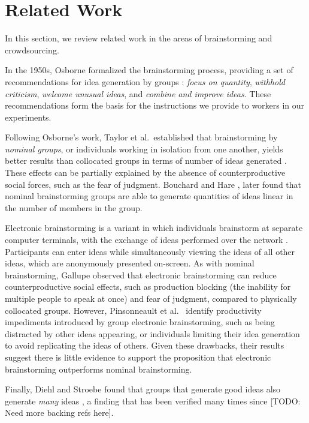 \section{Related Work}
In this section, we review related work in the areas of brainstorming and crowdsourcing.

In the 1950s, Osborne formalized the brainstorming process, providing a set of recommendations for idea generation by groups \cite{osborn_applied_1957}: \emph{focus on quantity}, \emph{withhold criticism}, \emph{welcome unusual ideas}, and \emph{combine and improve ideas}. These recommendations form the basis for the instructions we provide to workers in our experiments.

Following Osborne's work, Taylor et al.\ established that brainstorming by \emph{nominal groups}, or individuals working in isolation from one another, yields better results than collocated groups in terms of number of ideas generated \cite{taylor_does_1958}. These effects can be partially explained by the absence of counterproductive social forces, such as the fear of judgment. Bouchard and Hare \cite{bouchard_jr_size_1970}, later found that nominal brainstorming groups are able to generate quantities of ideas linear in the number of members in the group.

Electronic brainstorming is a variant in which individuals brainstorm at separate computer terminals, with the exchange of ideas performed over the network \cite{gallupe_electronic_1992}. Participants can enter ideas while simultaneously viewing the ideas of all other ideas, which are anonymously presented on-screen. As with nominal brainstorming, Gallupe \cite{gallupe_electronic_1992} observed that electronic brainstorming can reduce counterproductive social effects, such as production blocking (the inability for multiple people to speak at once) and fear of judgment, compared to physically collocated groups. However, Pinsonneault et al.\ \cite{pinsonneault_electronic_1999} identify productivity impediments introduced by group electronic brainstorming, such as being distracted by other ideas appearing, or individuals limiting their idea generation to avoid replicating the ideas of others. Given these drawbacks, their results suggest there is little evidence to support the proposition that electronic brainstorming outperforms nominal brainstorming.

Finally, Diehl and Stroebe found that groups that generate good ideas also generate \emph{many} ideas \cite{diehl_productivity_1987}, a finding that has been verified many times since [TODO: Need more backing refs here].

